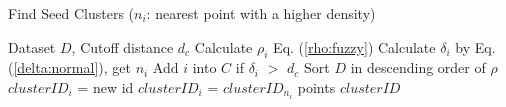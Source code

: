 \documentclass{llncs}
\begin{document}
%
\begin{algorithm}[htb] 
\vspace*{-.4cm}
\caption{Find Seed Clusters ($n_{i}$: nearest point with a higher density)} 
\begin{multicols}{2}
\label{alg:link} 
\begin{algorithmic}[1] 
\Require 
Dataset $D$, 
Cutoff distance $d_{c}$
\State Calculate $\rho_{i}$ Eq. (\ref{rho:fuzzy})
\EndFor
{} 
\State Calculate $\delta_{i}$ by Eq. (\ref{delta:normal}), get $n_{i}$
\State Add $i$ into $C$ if $\delta_{i}$ $>$ $d_{c}$
\EndFor
\State Sort $D$ in descending order of $\rho$
 $clusterID_{i}$ = new id
\Else{} $clusterID_{i}$ = $clusterID_{n_{i}}$
\EndIf 
\EndFor 
\Ensure points $clusterID$
\end{algorithmic} 
\end{multicols}
\vspace*{-.4cm}
\end{algorithm}
%
\end{document}
